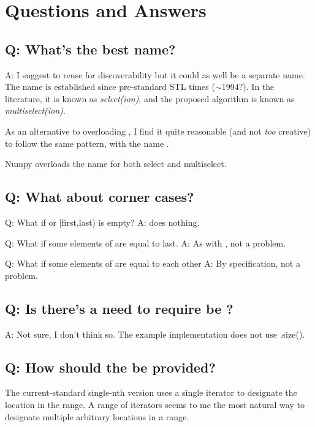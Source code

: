 \newpage
\section{Questions and Answers}

\subsection{Q: What's the best name?}

A: I suggest to reuse  for discoverability but it could as well be a separate name. The name  is established since pre-standard STL times ($\sim$1994?). In the literature\cite{Alsuwaiyel2001,Kaligosi2006,Panh2002,lent1996,Shen1997}, it is known as \emph{select(ion)}, and the proposed algorithm is known as \emph{multiselect(ion)}. 

As an alternative to overloading , I find it quite reasonable (and not \emph{too} creative) to follow the same pattern, with the name .

Numpy overloads the name  for both select and multiselect.

\subsection{Q: What about corner cases?}

Q: What if  or [first,last) is empty? A:  does nothing.

Q: What if some elements of  are equal to last. A: As with , not a problem.

Q: What if some elements of  are equal to each other A: By specification, not a problem.

\subsection{Q: Is there's a need to require  be ?}

A: Not sure, I don't think so. The example implementation does not use .size().


\subsection{Q: How should the  be provided?}

The current-standard single-nth version uses a single iterator  to designate the location in the range. A range of iterators seems to me the most natural way to designate multiple arbitrary locations in a range.

